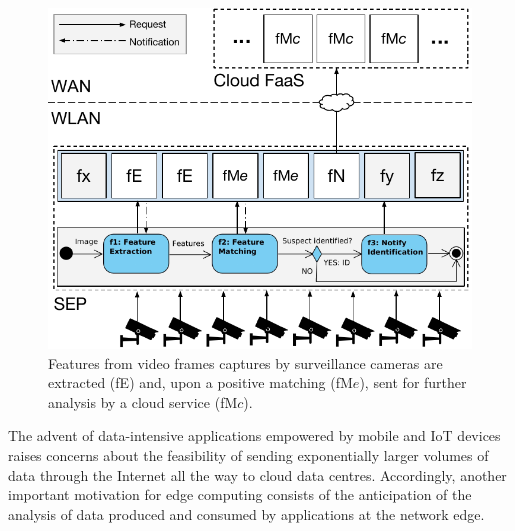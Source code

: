 \begin{figure}[tbp]
	\centering
	\includegraphics[width=\linewidth]{Figs/Edge_Data_Analytics_Video_Surveillance.pdf}
	\caption{Features from video frames captures by surveillance cameras are extracted (fE) and, upon a positive matching (fM$e$), sent for further analysis by a cloud service (fM$c$).}
	\label{fig:Edge_Data_Analytics_Video_Surveillance}
\end{figure}

The advent of data-intensive applications empowered by mobile and IoT devices raises concerns about the feasibility of sending exponentially larger volumes of data through the Internet all the way to cloud data centres. Accordingly, another important motivation for edge computing consists of the anticipation of the analysis of data produced and consumed by applications at the network edge. 


